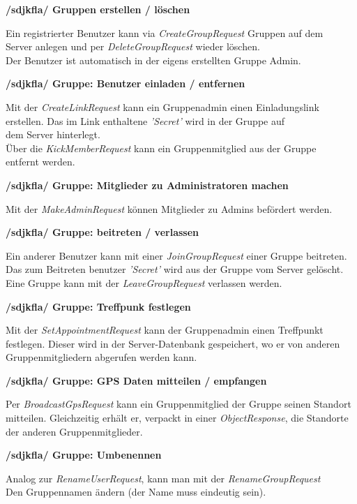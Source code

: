 \textbf{/sdjkfla/ Gruppen erstellen / löschen}

Ein registrierter Benutzer kann via \textit{CreateGroupRequest} Gruppen auf dem\\
Server anlegen und per \textit{DeleteGroupRequest} wieder löschen.\\
Der Benutzer ist automatisch in der eigens erstellten Gruppe Admin.

\textbf{/sdjkfla/ Gruppe: Benutzer einladen / entfernen}

Mit der \textit{CreateLinkRequest} kann ein Gruppenadmin einen Einladungslink\\
erstellen. Das im Link enthaltene \textit{'Secret'} wird in der Gruppe auf\\
dem Server hinterlegt.\\
Über die \textit{KickMemberRequest} kann ein Gruppenmitglied aus der Gruppe\\
entfernt werden.

\textbf{/sdjkfla/ Gruppe: Mitglieder zu Administratoren machen}

Mit der \textit{MakeAdminRequest} können Mitglieder zu Admins befördert werden.

\textbf{/sdjkfla/ Gruppe: beitreten / verlassen}

Ein anderer Benutzer kann mit einer \textit{JoinGroupRequest} einer Gruppe beitreten.\\
Das zum Beitreten benutzer \textit{'Secret'} wird aus der Gruppe vom Server gelöscht.\\
Eine Gruppe kann mit der \textit{LeaveGroupRequest} verlassen werden.

\textbf{/sdjkfla/ Gruppe: Treffpunk festlegen}

Mit der \textit{SetAppointmentRequest} kann der Gruppenadmin einen Treffpunkt festlegen.
Dieser wird in der Server-Datenbank gespeichert, wo er von anderen Gruppenmitgliedern
abgerufen werden kann.


\textbf{/sdjkfla/ Gruppe: GPS Daten mitteilen / empfangen}

Per \textit{BroadcastGpsRequest} kann ein Gruppenmitglied der Gruppe seinen Standort
mitteilen. Gleichzeitig erhält er, verpackt in einer \textit{ObjectResponse},
die Standorte der anderen Gruppenmitglieder.

\textbf{/sdjkfla/ Gruppe: Umbenennen}

Analog zur \textit{RenameUserRequest}, kann man mit der \textit{RenameGroupRequest}\\
Den Gruppennamen ändern (der Name muss eindeutig sein).

